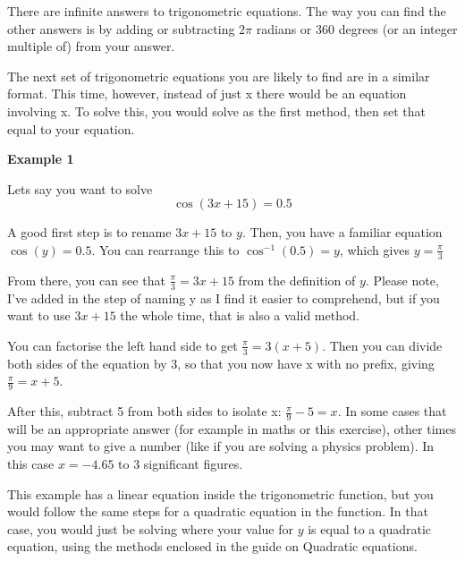 \documentclass[
  12pt,
  a4paper, oneside]{starmastarticle}
\begin{document}
There are infinite answers to trigonometric equations. The way you can
find the other answers is by adding or subtracting \(2\pi\) radians or
360 degrees (or an integer multiple of) from your answer.

The next set of trigonometric equations you are likely to find are in a
similar format. This time, however, instead of just x there would be an
equation involving x. To solve this, you would solve as the first
method, then set that equal to your equation.

\begin{tcolorbox}[enhanced jigsaw, leftrule=.75mm, rightrule=.15mm, breakable, left=2mm, colback=white, bottomrule=.15mm, arc=.35mm, toprule=.15mm, opacityback=0, colframe=quarto-callout-note-color-frame]
\begin{minipage}[t]{5.5mm}
\textcolor{quarto-callout-note-color}{\faInfo}
\end{minipage}%
\begin{minipage}[t]{\textwidth - 5.5mm}

\textbf{Example 1}\vspace{2mm}

Lets say you want to solve \[\cos(3x+15)=0.5\]

A good first step is to rename \(3x+15\) to \(y\). Then, you have a
familiar equation \(\cos(y)=0.5\). You can rearrange this to
\(\cos^{-1}(0.5)=y\), which gives \(y=\frac{\pi}{3}\)

From there, you can see that \(\frac{\pi}{3}=3x+15\) from the definition
of \(y\). Please note, I've added in the step of naming y as I find it
easier to comprehend, but if you want to use \(3x+15\) the whole time,
that is also a valid method.

You can factorise the left hand side to get \(\frac{\pi}{3}= 3(x+5)\).
Then you can divide both sides of the equation by 3, so that you now
have x with no prefix, giving \(\frac{\pi}{9}= x+5\).

After this, subtract 5 from both sides to isolate x:
\(\frac{\pi}{9}-5 =x\). In some cases that will be an appropriate answer
(for example in maths or this exercise), other times you may want to
give a number (like if you are solving a physics problem). In this case
\(x= -4.65\) to 3 significant figures.

This example has a linear equation inside the trigonometric function,
but you would follow the same steps for a quadratic equation in the
function. In that case, you would just be solving where your value for
\(y\) is equal to a quadratic equation, using the methods enclosed in
the guide on Quadratic equations.

\end{minipage}%
\end{tcolorbox}
\end{document}
